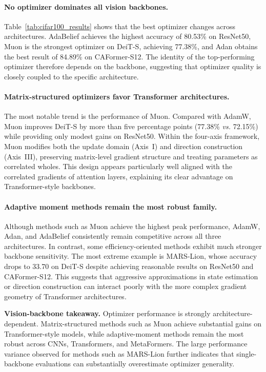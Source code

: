 \paragraph{No optimizer dominates all vision backbones.}

Table~\ref{tab:cifar100_results} shows that the best optimizer changes across
architectures. AdaBelief achieves the highest accuracy of 80.53\% on ResNet50,
Muon is the strongest optimizer on DeiT-S, achieving 77.38\%, and Adan obtains the best
result of 84.89\% on CAFormer-S12. The identity of the top-performing optimizer
therefore depends on the backbone, suggesting that optimizer quality is closely
coupled to the specific architecture.

\paragraph{Matrix-structured optimizers favor Transformer architectures.}

The most notable trend is the performance of Muon. Compared with AdamW, Muon
improves DeiT-S by more than five percentage points (77.38\% \textit{vs.} 72.15\%) while
providing only modest gains on ResNet50. Within the four-axis framework, Muon
modifies both the update domain (Axis~I) and direction construction
(Axis~III), preserving matrix-level gradient structure and treating
parameters as correlated wholes. This design appears particularly well aligned with
the correlated gradients of attention layers, explaining its clear advantage on
Transformer-style backbones.

\paragraph{Adaptive moment methods remain the most robust family.}
Although methods such as Muon achieve the highest peak performance, AdamW,
Adan, and AdaBelief consistently remain competitive across all three
architectures. In contrast, some efficiency-oriented methods exhibit much
stronger backbone sensitivity. The most extreme example is MARS-Lion, whose
accuracy drops to 33.70 on DeiT-S despite achieving reasonable results on
ResNet50 and CAFormer-S12. This suggests that aggressive approximations in
state estimation or direction construction can interact poorly with the more
complex gradient geometry of Transformer architectures.

\begin{takeaway}
\noindent\textbf{Vision-backbone takeaway.}
Optimizer performance is strongly architecture-dependent. Matrix-structured
methods such as Muon achieve substantial gains on Transformer-style models,
while adaptive-moment methods remain the most robust across CNNs,
Transformers, and MetaFormers. The large performance variance observed for
methods such as MARS-Lion further indicates that single-backbone evaluations
can substantially overestimate optimizer generality.
\end{takeaway}


